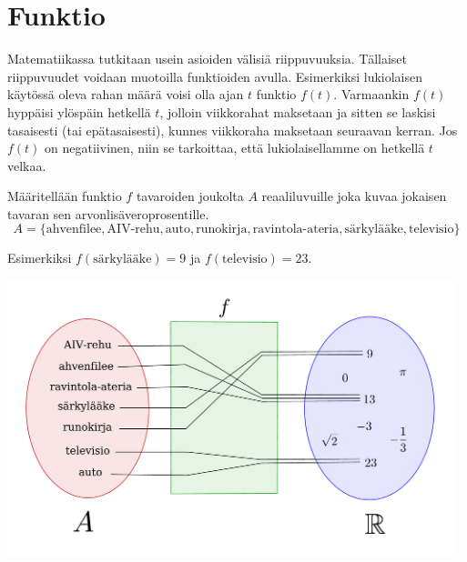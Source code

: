 \chapter{Funktio}

Matematiikassa tutkitaan usein asioiden välisiä riippuvuuksia. Tällaiset riippuvuudet voidaan muotoilla funktioiden avulla. Esimerkiksi lukiolaisen käytössä oleva rahan määrä voisi olla ajan $t$ funktio $f(t)$.  Varmaankin $f(t)$ 
hyppäisi ylöspäin hetkellä $t$, jolloin viikkorahat maksetaan ja sitten se laskisi tasaisesti (tai epätasaisesti), kunnes viikkoraha maksetaan seuraavan kerran.  Jos $f(t)$ on negatiivinen, niin se tarkoittaa, että lukiolaisellamme on hetkellä $t$ velkaa.


\begin{esimerkki}
Määritellään funktio $f$ tavaroiden joukolta $A$ reaaliluvuille joka kuvaa jokaisen tavaran sen arvonlisäveroprosentille.
\[A = \{\text{ahvenfilee}, \text{AIV-rehu}, \text{auto}, \text{runokirja}, \text{ravintola-ateria}, \text{särkylääke}, \text{televisio}\}\]

Esimerkiksi $f(\text{särkylääke}) = 9$ ja $f(\text{televisio}) = 23$.

\begin{center}
\includegraphics[width=13cm]{03-funktiot/kuvia/funktiokone.pdf}
\end{center}
\end{esimerkki}

